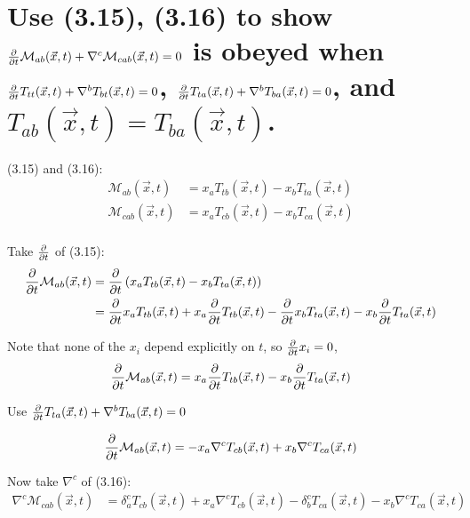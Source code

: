 \section{Use (3.15), (3.16) to show $\frac{\partial}{\partial t}\mathcal{M}_{ab}(\vec{x},t) + \nabla^c \mathcal{M}_{cab}(\vec{x}, t) = 0$ is obeyed when $\frac{\partial}{\partial t}T_{tt}(\vec{x},t) + \nabla^bT_{bt}(\vec{x},t) = 0$, $\frac{\partial}{\partial t}T_{ta}(\vec{x},t) + \nabla^bT_{ba}(\vec{x},t) = 0$, and $T_{ab}(\vec{x},t) = T_{ba}(\vec{x},t)$.}

(3.15) and (3.16):
\begin{align*}
    \mathcal{M}_{ab}(\vec{x}, t) &= x_a T_{tb}(\vec{x}, t) - x_b T_{ta}(\vec{x}, t)\\
    \mathcal{M}_{cab}(\vec{x}, t) &= x_a T_{cb}(\vec{x}, t) - x_b T_{ca}(\vec{x}, t)\\
\end{align*}

Take $\frac{\partial}{\partial t}$ of (3.15):
\begin{align*}
    \frac{\partial}{\partial t}\mathcal{M}_{ab}(\vec{x}, t) &= \frac{\partial}{\partial t}\left(x_a T_{tb}(\vec{x}, t) - x_b T_{ta}(\vec{x}, t)\right)\\
    &=  \frac{\partial}{\partial t}x_a T_{tb}(\vec{x}, t) + x_a \frac{\partial}{\partial t}T_{tb}(\vec{x}, t) - \frac{\partial}{\partial t}x_b T_{ta}(\vec{x}, t) - x_b \frac{\partial}{\partial t}T_{ta}(\vec{x}, t)\\
\end{align*}

Note that none of the $x_i$ depend explicitly on $t$, so $\frac{\partial}{\partial t}x_i = 0$,
\begin{align*}
    \frac{\partial}{\partial t}\mathcal{M}_{ab}(\vec{x}, t) 
    &=  x_a \frac{\partial}{\partial t}T_{tb}(\vec{x}, t) - x_b \frac{\partial}{\partial t}T_{ta}(\vec{x}, t)\\
\end{align*}

Use $\frac{\partial}{\partial t}T_{ta}(\vec{x},t) + \nabla^bT_{ba}(\vec{x},t) = 0$

\begin{align*}
    \frac{\partial}{\partial t}\mathcal{M}_{ab}(\vec{x}, t) &= 
    - x_a \nabla^cT_{cb}(\vec{x},t) 
    + x_b \nabla^cT_{ca}(\vec{x},t) \\
\end{align*}

Now take $\nabla^c$ of (3.16):
\begin{align*}
    \nabla^c \mathcal{M}_{cab}(\vec{x}, t) 
    &= \delta_a^c T_{cb}(\vec{x}, t) + x_a \nabla^c T_{cb}(\vec{x}, t) - \delta_b^c T_{ca}(\vec{x}, t) - x_b \nabla^c T_{ca}(\vec{x}, t) \\
\end{align*}

